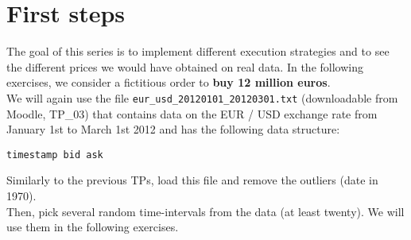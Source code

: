 \section*{First steps}
The goal of this series is to implement different execution strategies and to see the different prices we would have obtained on real data. In the following exercises, we consider a fictitious order to \textbf{buy 12 million euros}. \\

\noindent We will again use the file \texttt{eur\_usd\_20120101\_20120301.txt} (downloadable from Moodle, TP\_03) that contains data on the EUR / USD exchange rate from January 1st to March 1st 2012 and has the following data structure: \\

\begin{verbatim}
timestamp bid ask
\end{verbatim}

\noindent Similarly to the previous TPs, load this file and remove the outliers (date in 1970). \\

\noindent Then, pick several random time-intervals from the data (at least twenty). We will use them in the following exercises. \\

